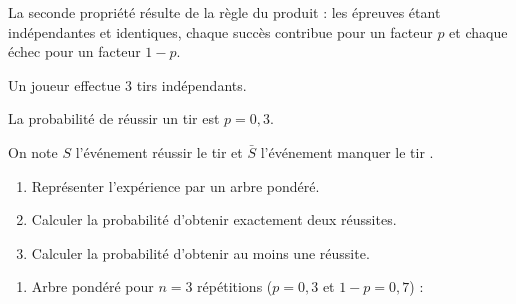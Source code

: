 \begin{rem}
	La seconde propriété résulte de la règle du produit : les épreuves étant indépendantes et identiques, chaque succès contribue pour un facteur $p$ et chaque échec pour un facteur $1 - p$.
\end{rem}

\newpage

\begin{methode}
	Un joueur effectue $3$ tirs indépendants.

	La probabilité de réussir un tir est $p = 0{,}3$.

	On note $S$ l'événement \og réussir le tir \fg{} et $\bar{S}$ l'événement \og manquer le tir \fg{}.

	\begin{enumerate}
		\item Représenter l'expérience par un arbre pondéré.
		\item Calculer la probabilité d'obtenir exactement deux réussites.
		\item Calculer la probabilité d'obtenir au moins une réussite.
	\end{enumerate}

	\begin{correction}
		\nline
		\begin{enumerate}
			\item Arbre pondéré pour $n = 3$ répétitions ($p = 0{,}3$ et $1 - p = 0{,}7$) :


\end{enumerate}
\end{correction}
\end{methode}
